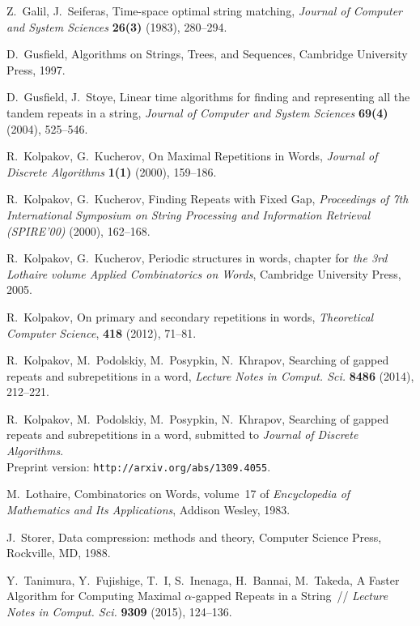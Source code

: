 \documentclass{article}
\begin{document}
\begin{thebibliography}{10}
Z.~Galil, J.~Seiferas, Time-space optimal string matching,
{\it Journal of Computer and System Sciences} {\bf  26(3)} (1983), 280--294.

D.~Gusfield, Algorithms on Strings, Trees, and Sequences,
Cambridge University Press, 1997.

D.~Gusfield, J.~Stoye, Linear time algorithms for finding and representing 
all the tandem repeats in a string, {\it Journal of Computer and System Sciences}
{\bf  69(4)} (2004), 525--546.

R.~Kolpakov, G.~Kucherov, On Maximal Repetitions in Words, 
{\it Journal of Discrete Algorithms}  {\bf 1(1)} (2000), 159--186.

R.~Kolpakov, G.~Kucherov, Finding Repeats with Fixed Gap,
{\it Proceedings of 7th International Symposium on String
 Processing and Information Retrieval (SPIRE'00)} (2000), 162--168.

R.~Kolpakov, G.~Kucherov, Periodic structures in words, chapter for 
{\it the 3rd Lothaire volume Applied Combinatorics on Words}, Cambridge 
University Press, 2005.

R.~Kolpakov, On primary and secondary repetitions in words,
{\it Theoretical Computer Science}, {\bf 418} (2012), 71--81.

R.~Kolpakov, M.~Podolskiy, M.~Posypkin, N.~Khrapov, Searching of gapped repeats and 
subrepetitions in a word, {\it Lecture Notes in Comput. Sci.} {\bf 8486} (2014), 212--221.

R.~Kolpakov, M.~Podolskiy, M.~Posypkin, N.~Khrapov, Searching of gapped repeats 
and subrepetitions in a word, submitted to {\it Journal of Discrete Algorithms}.\\
Preprint version: {\tt http://arxiv.org/abs/1309.4055}.


M.~Lothaire, Combinatorics on Words, volume~17 of {\it Encyclopedia of
Mathematics and Its Applications}, Addison Wesley, 1983.

J.~Storer, Data compression: methods and theory,
Computer Science Press, Rockville, MD, 1988.

Y.~Tanimura, Y.~Fujishige, T.~I, S.~Inenaga, H.~Bannai, M.~Takeda,
A Faster Algorithm for Computing Maximal {\(\alpha\)}-gapped Repeats in a String~//
{\it Lecture Notes in Comput. Sci.} {\bf 9309} (2015), 124--136.
\end{thebibliography}
\end{document}
